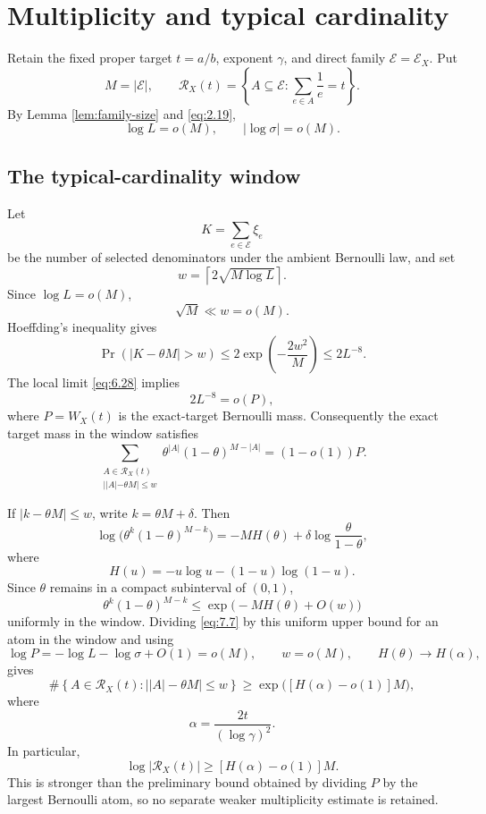 \section{Multiplicity and typical cardinality}\label{sec:multiplicity}

Retain the fixed proper target $t=a/b$, exponent $\gamma$, and direct family $\mathcal E=\mathcal E_X$. Put
\[
M=|\mathcal E|,
\qquad
\mathcal R_X(t)=
\left\{A\subseteq\mathcal E:
\sum_{e\in A}\frac1e=t\right\}.
\tag{7.1}\label{eq:7.1}
\]
By Lemma \ref{lem:family-size} and \eqref{eq:2.19},
\[
\log L=o(M),
\qquad
|\log\sigma|=o(M).
\tag{7.2}\label{eq:7.2}
\]

\subsection{The typical-cardinality window}

Let
\[
K=\sum_{e\in\mathcal E}\xi_e
\]
be the number of selected denominators under the ambient Bernoulli law, and set
\[
w=
\left\lceil2\sqrt{M\log L}\right\rceil.
\tag{7.3}\label{eq:7.3}
\]
Since $\log L=o(M)$,
\[
\sqrt M\ll w=o(M).
\tag{7.4}\label{eq:7.4}
\]
Hoeffding's inequality \cite{Hoeffding1963} gives
\[
\Pr(|K-\theta M|>w)
\le
2\exp\left(-\frac{2w^2}{M}\right)
\le
2L^{-8}.
\tag{7.5}\label{eq:7.5}
\]
The local limit \eqref{eq:6.28} implies
\[
2L^{-8}=o(P),
\tag{7.6}\label{eq:7.6}
\]
where $P=W_X(t)$ is the exact-target Bernoulli mass. Consequently the exact target mass in the window satisfies
\[
\sum_{\substack{A\in\mathcal R_X(t)\\
||A|-\theta M|\le w}}
\theta^{|A|}(1-\theta)^{M-|A|}
=(1-o(1))P.
\tag{7.7}\label{eq:7.7}
\]

If $|k-\theta M|\le w$, write $k=\theta M+\delta$. Then
\[
\log\bigl(\theta^k(1-\theta)^{M-k}\bigr)
=
-MH(\theta)
+\delta\log\frac{\theta}{1-\theta},
\tag{7.8}\label{eq:7.8}
\]
where
\[
H(u)=-u\log u-(1-u)\log(1-u).
\]
Since $\theta$ remains in a compact subinterval of $(0,1)$,
\[
\theta^k(1-\theta)^{M-k}
\le
\exp\bigl(-MH(\theta)+O(w)\bigr)
\tag{7.9}\label{eq:7.9}
\]
uniformly in the window. Dividing \eqref{eq:7.7} by this uniform upper bound for an atom in the window and using
\[
\log P=-\log L-\log\sigma+O(1)=o(M),
\qquad
w=o(M),
\qquad
H(\theta)\to H(\alpha),
\]
gives
\[
\#\left\{A\in\mathcal R_X(t):
\bigl||A|-\theta M\bigr|\le w\right\}
\ge
\exp\bigl([H(\alpha)-o(1)]M\bigr),
\tag{7.10}\label{eq:7.10}
\]
where
\[
\alpha=\frac{2t}{(\log\gamma)^2}.
\tag{7.11}\label{eq:7.11}
\]
In particular,
\[
\log|\mathcal R_X(t)|
\ge
[H(\alpha)-o(1)]M.
\tag{7.12}\label{eq:7.12}
\]
This is stronger than the preliminary bound obtained by dividing $P$ by the largest Bernoulli atom, so no separate weaker multiplicity estimate is retained.

